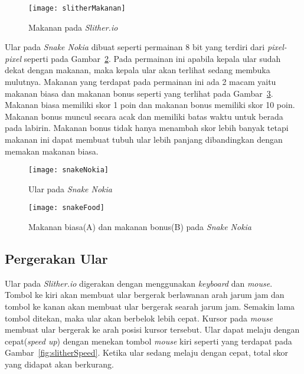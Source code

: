\begin{figure}[H]
	\centering  
	\texttt{[image: slitherMakanan]}  
	\caption[Makanan pada \textit{Slither.io}]{Makanan pada \textit{Slither.io}}
	\label{fig:slitherMakanan} 
\end{figure}

Ular pada \textit{Snake Nokia} dibuat seperti permainan 8 bit yang terdiri dari \textit{pixel-pixel} seperti pada Gambar~\ref{fig:snakeNokia}. Pada permainan ini apabila kepala ular sudah dekat dengan makanan, maka kepala ular akan terlihat sedang membuka mulutnya. Makanan yang terdapat pada permainan ini ada 2 macam yaitu makanan biasa dan makanan bonus seperti yang terlihat pada Gambar~\ref{fig:snakeFood}. Makanan biasa memiliki skor 1 poin dan makanan bonus memiliki skor 10 poin. Makanan bonus muncul secara acak dan memiliki batas waktu untuk berada pada labirin. Makanan bonus tidak hanya menambah skor lebih banyak tetapi makanan ini dapat membuat tubuh ular lebih panjang dibandingkan dengan memakan makanan biasa.

\begin{figure}[H]
	\centering  
	\texttt{[image: snakeNokia]}  
	\caption[Ular pada \textit{Snake Nokia}]{Ular pada \textit{Snake Nokia}}
	\label{fig:snakeNokia} 
\end{figure}

\begin{figure}[H]
	\centering  
	\texttt{[image: snakeFood]}  
	\caption[Makanan biasa(A) dan makanan bonus(B) pada \textit{Snake Nokia}]{Makanan biasa(A) dan makanan bonus(B) pada \textit{Snake Nokia}}
	\label{fig:snakeFood} 
\end{figure}

\subsection{Pergerakan Ular}
Ular pada \textit{Slither.io} digerakan dengan menggunakan \textit{keyboard} dan \textit{mouse}. Tombol ke kiri akan membuat ular bergerak berlawanan arah jarum jam dan tombol ke kanan akan membuat ular bergerak searah jarum jam. Semakin lama tombol ditekan, maka ular akan berbelok lebih cepat. Kursor pada \textit{mouse} membuat ular bergerak ke arah posisi kursor tersebut. Ular dapat melaju dengan cepat(\textit{speed up}) dengan menekan tombol \textit{mouse} kiri seperti yang terdapat pada Gambar~\ref{fig:slitherSpeed}. Ketika ular sedang melaju dengan cepat, total skor yang didapat akan berkurang. 

